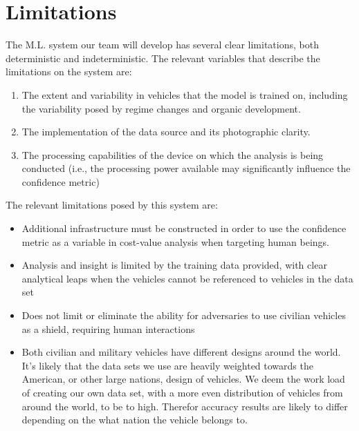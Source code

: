 \documentclass[12pt,twoside]{article}
\begin{document}
\section{Limitations}
The M.L. system our team will develop has several clear limitations, both deterministic and indeterministic. The relevant variables that describe the limitations on the system are:

\begin{enumerate}
    \itemsep0em 
    \item The extent and variability in vehicles that the model is trained on, including the variability posed by regime changes and organic development.
    \item The implementation of the data source and its photographic clarity.
    \item The processing capabilities of the device on which the analysis is being conducted (i.e., the processing power available may significantly influence the confidence metric)
\end{enumerate}

The relevant limitations posed by this system are:
\begin{itemize}
    \itemsep0em 
    \item Additional infrastructure must be constructed in order to use the confidence metric as a variable in cost-value analysis when targeting human beings.
    \item Analysis and insight is limited by the training data provided, with clear analytical leaps when the vehicles cannot be referenced to vehicles in the data set
    \item Does not limit or eliminate the ability for adversaries to use civilian vehicles as a shield, requiring human interactions
    \item Both civilian and military vehicles have different designs around the world. It's likely that the data sets we use are heavily weighted towards the American, or other large nations, design of vehicles. We deem the work load of creating our own data set, with a more even distribution of vehicles from around the world, to be to high. Therefor accuracy results are likely to differ depending on the what nation the vehicle belongs to.
\end{itemize}


\end{document}
